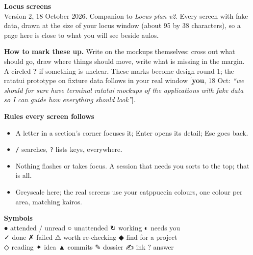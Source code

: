 \documentclass[10pt]{extarticle}
\newcommand{\you}[2]{{\small[\textbf{you}, #1: \textit{``#2''}]}}
\begin{document}
{\Large\bfseries Locus screens}\\[0.2em]
{\small Version 2, 18 October 2026. Companion to \textit{Locus plan v2}. Every screen with fake data, drawn at the size of your locus window (about 95 by 38 characters), so a page here is close to what you will see beside aulos.}

\medskip
\noindent\begin{minipage}[t]{0.5\linewidth}\vspace{0pt}
\textbf{How to mark these up.} Write on the mockups themselves: cross out what should go, draw where things should move, write what is missing in the margin. A circled \textbf{?} if something is unclear. These marks become design round 1; the ratatui prototype on fixture data follows in your real window \you{18 Oct}{we should for sure have terminal ratatui mockups of the applications with fake data so I can guide how everything should look}.

\medskip
\textbf{Rules every screen follows}
\begin{itemize}
\item A letter in a section's corner focuses it; Enter opens its detail; Esc goes back.
\item \texttt{/} searches, \texttt{?} lists keys, everywhere.
\item Nothing flashes or takes focus. A session that needs you sorts to the top; that is all.
\item Greyscale here; the real screens use your catppuccin colours, one colour per area, matching kairos.
\end{itemize}

\medskip
\textbf{Symbols}\\[0.2em]
{\small\ttfamily ● attended / unread \quad ○ unattended \quad ↻ working \quad ◐ needs you\\ ✓ done \quad ✗ failed \quad ⚠ worth re-checking \quad ◆ find for a project\\ ◇ reading \quad ✦ idea \quad ▲ commits \quad ✎ dossier \quad ✍ ink \quad ? answer}
\end{minipage}\hfill
\end{document}
